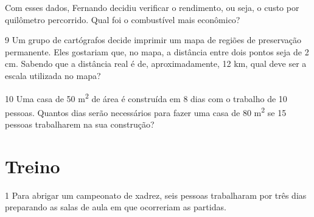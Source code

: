 \begin{escolha}
\begin{escolha}
Com esses dados, Fernando decidiu verificar o rendimento, ou seja, o custo 
por quilômetro percorrido. Qual foi o combustível mais econômico?

\begin{boxpeq}
\end{boxpeq}

\num{9} Um grupo de cartógrafos decide imprimir um mapa de regiões de
preservação permanente. Eles gostariam que, no mapa, a distância entre
dois pontos seja de 2 cm. Sabendo que a distância real é de,
aproximadamente, 12 km, qual deve ser a escala utilizada no mapa?


\num{10} Uma casa de 50 m\textsuperscript{2} de área é construída em 8 dias 
com o trabalho de 10 pessoas. Quantos dias serão necessários para fazer uma 
casa de 80 m\textsuperscript{2} se 15 pessoas trabalharem na sua construção?

\begin{boxmedio}
\end{boxmedio}

\section{Treino}

\num{1} Para abrigar um campeonato de xadrez, seis pessoas trabalharam por 
três dias preparando as salas de aula em que ocorreriam as partidas.


\end{escolha}
\end{escolha}
